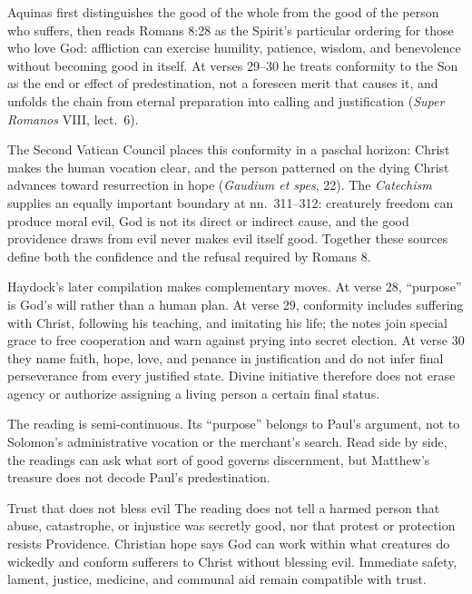 Aquinas first distinguishes the good of the whole from the good of the person who suffers, then reads Romans 8:28 as the Spirit's particular ordering for those who love God: affliction can exercise humility, patience, wisdom, and benevolence without becoming good in itself. At verses 29--30 he treats conformity to the Son as the end or effect of predestination, not a foreseen merit that causes it, and unfolds the chain from eternal preparation into calling and justification (\emph{Super Romanos} VIII, lect.~6).

The Second Vatican Council places this conformity in a paschal horizon: Christ makes the human vocation clear, and the person patterned on the dying Christ advances toward resurrection in hope (\emph{Gaudium et spes}, 22). The \emph{Catechism} supplies an equally important boundary at nn.~311--312: creaturely freedom can produce moral evil, God is not its direct or indirect cause, and the good providence draws from evil never makes evil itself good. Together these sources define both the confidence and the refusal required by Romans 8.

Haydock's later compilation makes complementary moves. At verse 28, ``purpose'' is God's will rather than a human plan. At verse 29, conformity includes suffering with Christ, following his teaching, and imitating his life; the notes join special grace to free cooperation and warn against prying into secret election. At verse 30 they name faith, hope, love, and penance in justification and do not infer final perseverance from every justified state. Divine initiative therefore does not erase agency or authorize assigning a living person a certain final status.

The reading is semi-continuous. Its ``purpose'' belongs to Paul's argument, not to Solomon's administrative vocation or the merchant's search. Read side by side, the readings can ask what sort of good governs discernment, but Matthew's treasure does not decode Paul's predestination.

\begin{studybox}{Trust that does not bless evil}
The reading does not tell a harmed person that abuse, catastrophe, or injustice was secretly good, nor that protest or protection resists Providence. Christian hope says God can work within what creatures do wickedly and conform sufferers to Christ without blessing evil. Immediate safety, lament, justice, medicine, and communal aid remain compatible with trust.
\end{studybox}

